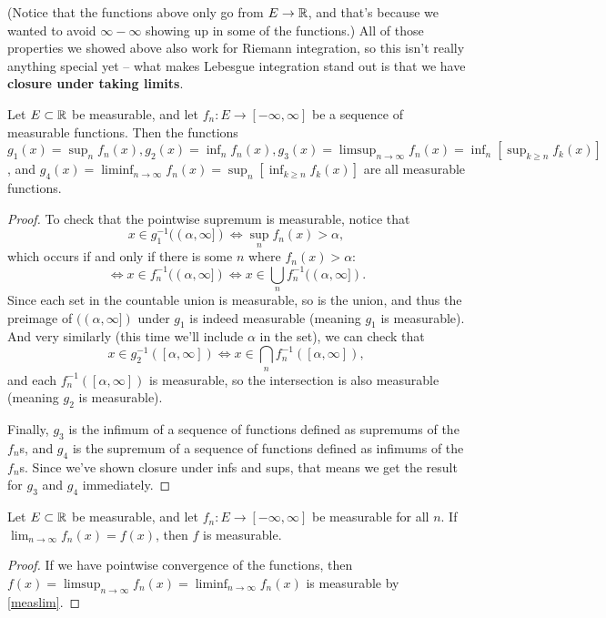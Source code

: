 (Notice that the functions above only go from $E \to \mathbb R$, and that's because we wanted to avoid $\infty - \infty$ showing up in some of the functions.) All of those properties we showed above also work for Riemann integration, so this isn't really anything special yet -- what makes Lebesgue integration stand out is that we have \textbf{closure under taking limits}.

\begin{theorem}\label{measlim}
Let $E \subset \mathbb R$ be measurable, and let $f_n: E \to [-\infty, \infty]$ be a sequence of measurable functions. Then the functions $g_1(x) = \sup_n f_n(x), g_2(x) = \inf_n f_n(x), g_3(x) = \limsup_{n \to \infty} f_n(x) = \inf_{n} \left[\sup_{k \ge n} f_k(x)\right]$, and $g_4(x) = \liminf_{n \to \infty} f_n(x) = \sup_n \left[\inf_{k \ge n} f_k(x) \right]$ are all measurable functions.
\end{theorem}
\begin{proof}
To check that the pointwise supremum is measurable, notice that
\[
    x \in g_1^{-1}((\alpha, \infty]) \iff \sup_n f_n(x) > \alpha,
\]
which occurs if and only if there is some $n$ where $f_n(x) > \alpha$: 
\[
    \iff x \in f_n^{-1}((\alpha, \infty]) \iff x \in \bigcup_n f_n^{-1}((\alpha, \infty]).
\]
Since each set in the countable union is measurable, so is the union, and thus the preimage of $((\alpha, \infty])$ under $g_1$ is indeed measurable (meaning $g_1$ is measurable). And very similarly (this time we'll include $\alpha$ in the set), we can check that
\[
    x \in g_2^{-1}([\alpha, \infty]) \iff x \in \bigcap_n f_n^{-1}([\alpha, \infty]),
\]
and each $f_n^{-1}([\alpha, \infty])$ is measurable, so the intersection is also measurable (meaning $g_2$ is measurable).

Finally, $g_3$ is the infimum of a sequence of functions defined as supremums of the $f_n$s, and $g_4$ is the supremum of a sequence of functions defined as infimums of the $f_n$s. Since we've shown closure under infs and sups, that means we get the result for $g_3$ and $g_4$ immediately.
\end{proof}

\begin{corollary}
Let $E \subset \mathbb R$ be measurable, and let $f_n: E \to [-\infty, \infty]$ be measurable for all $n$. If $\lim_{n \to \infty} f_n(x) = f(x)$, then $f$ is measurable.
\end{corollary}
\begin{proof}
If we have pointwise convergence of the functions, then $f(x) = \limsup_{n \to \infty} f_n(x) = \liminf_{n \to \infty} f_n(x)$ is measurable by \cref{measlim}.
\end{proof}

